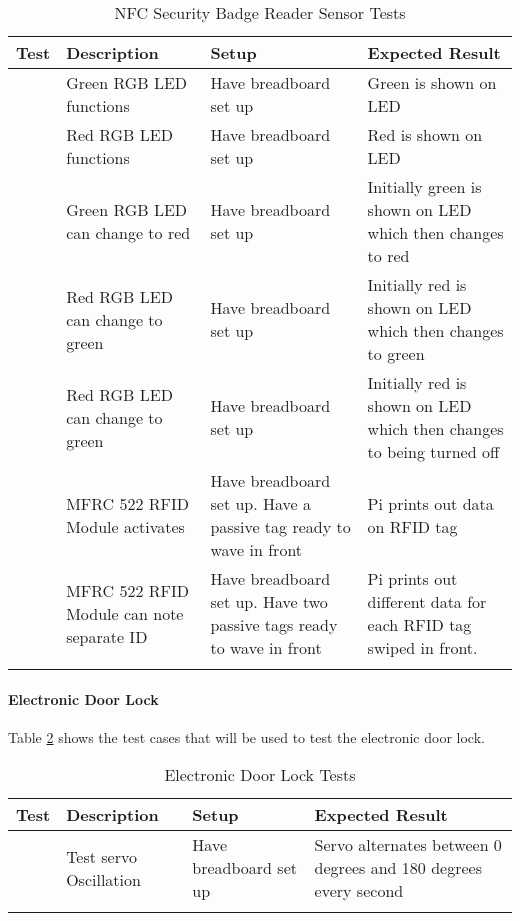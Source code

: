 \begin{longtable}[htb]{>{\centering\arraybackslash}m{0.75cm}|>{\centering\arraybackslash}m{4cm}|>{\centering\arraybackslash}m{4.5cm}|>{\centering\arraybackslash}m{4cm}}
\toprule
Test & Description & Setup & Expected Result \\
\midrule
1 & Green RGB LED functions & Have breadboard set up & Green is shown on LED \\
\hline
2 & Red RGB LED functions & Have breadboard set up & Red is shown on LED \\
\hline
3 & Green RGB LED can change to red & Have breadboard set up & Initially green
is shown on LED which then changes to red \\
\hline
4 & Red RGB LED can change to green & Have breadboard set up & Initially red is
shown on LED which then changes to green \\
\hline
5 & Red RGB LED can change to green & Have breadboard set up & Initially red is
shown on LED which then changes to being turned off \\
\hline
6 & MFRC 522 RFID Module activates & Have breadboard set up. Have a passive tag
ready to wave in front & Pi prints out data on RFID tag \\
\hline
7 & MFRC 522 RFID Module can note separate ID & Have breadboard set up. Have two
passive tags ready to wave in front & Pi prints out different data for each RFID
tag swiped in front. \\

\bottomrule
\caption{NFC Security Badge Reader Sensor Tests}
\label{table:nfc-tests}
\end{longtable}

\paragraph{Electronic Door Lock}

Table \ref{table:servo-tests} shows the test cases that will be used to test the
electronic door lock.

\begin{longtable}[htb]{>{\centering\arraybackslash}m{0.75cm}|>{\centering\arraybackslash}m{4cm}|>{\centering\arraybackslash}m{4.5cm}|>{\centering\arraybackslash}m{4cm}}
\toprule
Test & Description & Setup & Expected Result \\
\midrule
1 & Test servo Oscillation & Have breadboard set up & Servo alternates between
0 degrees and 180 degrees every second \\
\bottomrule
\caption{Electronic Door Lock Tests}
\label{table:servo-tests}
\end{longtable}

